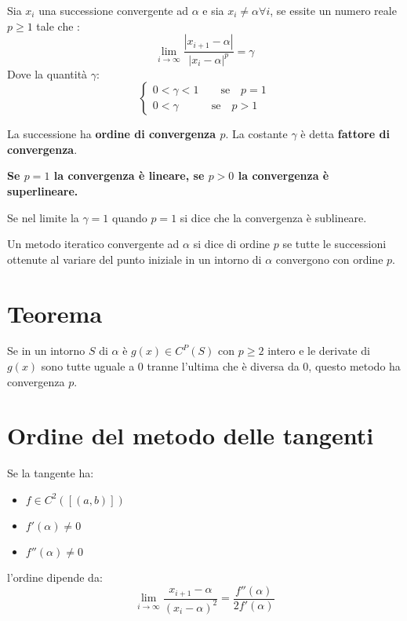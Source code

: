 Sia ${x_i}$ una successione convergente ad $\alpha$ e sia $x_i \neq \alpha \forall i$, se essite un numero reale $p\geq 1$ tale che :
\begin{equation}
  \lim_{i \to \infty} \frac{|x_{i+1}-\alpha|}{|x_i-\alpha|^p} = \gamma
\end{equation}
Dove la quantità $\gamma$:
\begin{equation}
  \begin{cases}
    0 < \gamma < 1 \quad\quad \text{se}\quad p = 1 \\
    0<\gamma \quad\quad\quad \text{se}\quad p > 1
  \end{cases}
\end{equation}

La successione ha \textbf{ordine di convergenza $p$}.
La costante $\gamma$ è detta \textbf{fattore di convergenza}.

\textbf{Se $p = 1$ la convergenza è lineare, se $p > 0$ la convergenza è superlineare.}

Se nel limite la $\gamma = 1$ quando $p=1$ si dice che la convergenza è sublineare.

Un metodo iteratico convergente ad $\alpha$ si dice di ordine $p$ se tutte le successioni
ottenute al variare del punto iniziale in un intorno di $\alpha$ convergono con ordine $p$.

\section{Teorema}

Se in un intorno $S$ di $\alpha$ è $g(x)\in C^P(S)$ con $p \geq 2$ intero e le derivate di $g(x)$
sono tutte uguale a $0$ tranne l'ultima che è diversa da 0, questo metodo ha convergenza $p$.

\section{Ordine del metodo delle tangenti}
Se la tangente ha:
\begin{itemize}
  \item $f \in C^2([(a, b)])$
  \item $f'(\alpha) \neq 0$
  \item $f''(\alpha) \neq 0$
\end{itemize}

l'ordine dipende da:
\begin{equation}
  \lim_{i \to \infty} \frac{x_{i+1} - \alpha}{(x_i - \alpha)^2} = \frac{f''(\alpha)}{2f'(\alpha)}
\end{equation}

